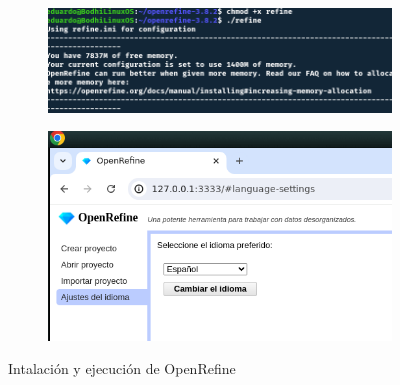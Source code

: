 \documentclass[12pt]{article}
\begin{document}
\begin{itemize}
\begin{figure}[!h]
\begin{subfigure}[b]{0.7\textwidth}
                                \includegraphics[width=\textwidth]{img/openrefine-5.png}
                            \end{subfigure}
                            \hfill
                            \begin{subfigure}[b]{0.6\textwidth}
                                
                                \includegraphics[width=\textwidth]{img/openrefine-6.png}
                            \end{subfigure}
                            \caption{Intalación y ejecución de OpenRefine}
                        \end{figure}
                    

\end{itemize}
\end{document}

